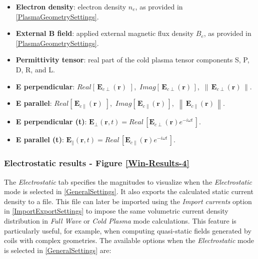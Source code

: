 \begin{itemize}\itemsep0em 
	\item \textbf{Electron density}: electron density $n_{e}$, as provided in \ref{PlasmaGeometrySettings}.
	\quad
	\item \textbf{External B field}: applied external magnetic flux density $B_{e}$, as provided in \ref{PlasmaGeometrySettings}.
	\quad
	\item \textbf{Permittivity tensor}: real part of the cold plasma tensor components S, P, D, R, and L.
	\quad
	\item \textbf{E perpendicular}: $Real\left[\,\mathbf{E}_{c\perp}(\mathbf{r})\,\,\right]$, $\,Imag\left[\,\mathbf{E}_{c\perp}(\mathbf{r})\,\right]$, $\,\left\|\,\mathbf{E}_{c\perp}(\mathbf{r})\,\right\|$.
	\quad
	\item \textbf{E parallel}: $Real\left[\,\mathbf{E}_{c\parallel}(\mathbf{r})\,\,\right]$, $\,Imag\left[\,\mathbf{E}_{c\parallel}(\mathbf{r})\,\right]$, $\,\left\|\,\mathbf{E}_{c\parallel}(\mathbf{r})\,\right\|$.
	\quad
	\item \textbf{E perpendicular (t)}: $\mathbf{E}_{\perp}(\mathbf{r},t) = Real\,\left[\mathbf{E}_{c\perp}(\mathbf{r})e^{-i\omega t}\,\right]$.
	\quad
	\item \textbf{E parallel (t)}: $\mathbf{E}_{\parallel}(\mathbf{r},t) = Real\,\left[\mathbf{E}_{c\parallel}(\mathbf{r})e^{-i\omega t}\,\right]$.
\end{itemize}

\subsubsection{Electrostatic results - Figure \ref{Win-Results-4}}\label{ElectrostaticResults}

The \textit{Electrostatic} tab specifies the magnitudes to visualize when the \textit{Electrostatic} mode is selected in \ref{GeneralSettings}. It also exports the calculated static current density to a file. This file can later be imported using the \emph{Import currents} option in \ref{ImportExportSettings} to impose the same volumetric current density distribution in \textit{Full Wave} or \textit{Cold Plasma} mode calculations. This feature is particularly useful, for example, when computing quasi-static fields generated by coils with complex geometries. The available options when the \textit{Electrostatic} mode is selected in \ref{GeneralSettings} are:

